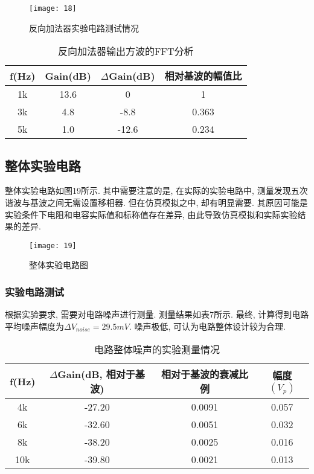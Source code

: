 \documentclass[UTF2]{ctexart}
\begin{document}
	\begin{figure}[h]
		\centering
		\texttt{[image: 18]}
		\caption{反向加法器实验电路测试情况}
	\end{figure}
		
	\begin{table}[h]
		\centering
		\caption{反向加法器输出方波的FFT分析}
		\begin{tabular}{c c c c}
			\hline
			f(Hz) & Gain(dB) & $\Delta$Gain(dB) & 相对基波的幅值比 \\
			\hline
			1k & 13.6 & 0 & 1\\
			3k & 4.8 & -8.8 & 0.363\\
			5k & 1.0 & -12.6 & 0.234\\
			\hline
		\end{tabular}
	\end{table}
	
	\subsection{整体实验电路}
	
	整体实验电路如图19所示. 其中需要注意的是, 在实际的实验电路中, 测量发现五次谐波与基波之间无需设置移相器. 但在仿真模拟之中, 却有明显需要.  其原因可能是实验条件下电阻和电容实际值和标称值存在差异, 由此导致仿真模拟和实际实验结果的差异.
	
	\begin{figure}[h]
		\centering
		\texttt{[image: 19]} 
		\caption{整体实验电路图}
	\end{figure}
	
	\subsubsection{实验电路测试}
	
	根据实验要求, 需要对电路噪声进行测量. 测量结果如表7所示. 最终, 计算得到电路平均噪声幅度为$\Delta V_{noise} = 29.5mV$. 噪声极低, 可认为电路整体设计较为合理.
	
	\begin{table}[h]
		\centering
		\caption{电路整体噪声的实验测量情况}
		\begin{tabular}{c c c c}
			\hline
			f(Hz) & $\Delta$Gain(dB, 相对于基波) & 相对于基波的衰减比例 & 幅度$(V_p)$ \\
			\hline
	        4k & -27.20 & 0.0091 & 0.057 \\
			6k & -32.60 & 0.0051 & 0.032 \\
			8k & -38.20 & 0.0025 & 0.016 \\
            10k & -39.80 & 0.0021 & 0.013 \\
			\hline
		\end{tabular}
	\end{table}
	
\end{document}
